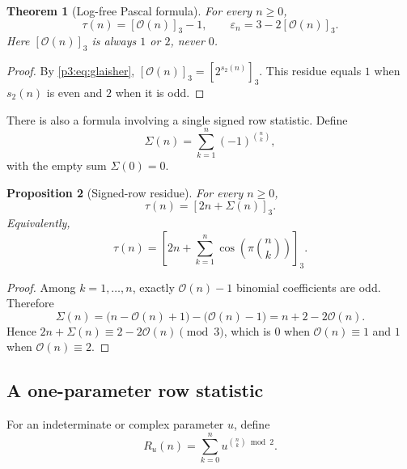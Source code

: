 \documentclass[11pt,oneside]{article}
\newtheorem{theorem}{Theorem}[section]
\newtheorem{proposition}[theorem]{Proposition}
\theoremstyle{definition}
\theoremstyle{remark}
\newcommand{\bitsum}{s_2}
\newcommand{\eps}{\varepsilon}
\begin{document}
\begin{theorem}[Log-free Pascal formula]\label{p3:thm:log-free-pascal}
For every $n\ge0$,
\begin{equation}\label{p3:eq:log-free-pascal}
 \boxed{\quad
 \tau(n)=[\mathcal O(n)]_3-1,
 \qquad
 \eps_n=3-2[\mathcal O(n)]_3.
 \quad}
\end{equation}
Here $[\mathcal O(n)]_3$ is always $1$ or $2$, never $0$.
\end{theorem}

\begin{proof}
By \cref{p3:eq:glaisher},
$[\mathcal O(n)]_3=[2^{\bitsum(n)}]_3$.  This residue equals $1$ when
$\bitsum(n)$ is even and $2$ when it is odd.
\end{proof}

There is also a formula involving a single signed row statistic.  Define
\begin{equation}\label{p3:eq:signed-row-statistic}
 \Sigma(n)=\sum_{k=1}^{n}(-1)^{\binom nk},
\end{equation}
with the empty sum $\Sigma(0)=0$.

\begin{proposition}[Signed-row residue]\label{p3:prop:signed-row-residue}
For every $n\ge0$,
\begin{equation}\label{p3:eq:signed-row-residue}
 \boxed{\qquad \tau(n)=[2n+\Sigma(n)]_3.\qquad}
\end{equation}
Equivalently,
\begin{equation}\label{p3:eq:signed-row-trig}
 \tau(n)=\left[2n+\sum_{k=1}^{n}
          \cos\!\left(\pi\binom nk\right)\right]_3.
\end{equation}
\end{proposition}

\begin{proof}
Among $k=1,\ldots,n$, exactly $\mathcal O(n)-1$ binomial coefficients are odd.
Therefore
\[
 \Sigma(n)=\bigl(n-\mathcal O(n)+1\bigr)-\bigl(\mathcal O(n)-1\bigr)
          =n+2-2\mathcal O(n).
\]
Hence $2n+\Sigma(n)\equiv2-2\mathcal O(n)\pmod3$, which is $0$ when
$\mathcal O(n)\equiv1$ and $1$ when $\mathcal O(n)\equiv2$.
\end{proof}

\subsection{A one-parameter row statistic}

For an indeterminate or complex parameter $u$, define
\begin{equation}\label{p3:eq:Ru-definition}
 R_u(n)=\sum_{k=0}^{n}u^{\binom nk\bmod2}.
\end{equation}
\end{document}
